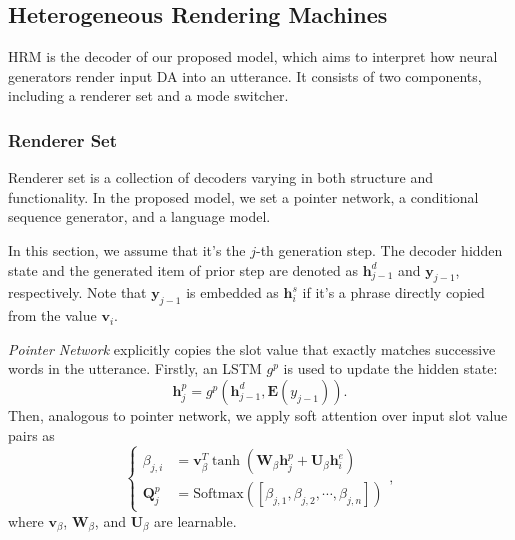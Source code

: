 \documentclass[letterpaper]{article} %
\begin{document}
\subsection{Heterogeneous Rendering Machines}
\label{sec:Heterogeneous Rendering Machines}

	HRM is the decoder of our proposed model, which aims to interpret how neural generators render input DA into an utterance. It consists of two components, including a renderer set and a mode switcher.

\subsubsection{Renderer Set}

	Renderer set is a collection of decoders varying in both structure and functionality. In the proposed model, we set a pointer network, a conditional sequence generator, and a language model.

	In this section, we assume that it's the $j$-th generation step. The decoder hidden state and the generated item of prior step are denoted as $\mathbf{h}_{j-1}^d$ and $\mathbf{y}_{j-1}$, respectively. Note that $\mathbf{y}_{j-1}$ is embedded as $\mathbf{h}_i^s$ if it's a phrase directly copied from the value $\mathbf{v}_i$.

	\textit{Pointer Network} explicitly copies the slot value that exactly matches successive words in the utterance. Firstly, an LSTM $g^{p}$ is used to update the hidden state:
	\begin{equation}
	\mathbf{h}_j^p = g^p(\mathbf{h}_{j-1}^d, \mathbf{E}(y_{j-1})).
	\end{equation}
	Then, analogous to pointer network, we apply soft attention over input slot value pairs as
	\begin{equation}
	\left\{\begin{aligned}
	\beta_{j,i} & = \mathbf{v}^T_{\beta} \tanh(\mathbf{W}_{\beta} \mathbf{h}^p_{j} + \mathbf{U}_{\beta}\mathbf{h}^e_i) \\
	\mathbf{Q}^p_j & = \mathrm{Softmax}([\beta_{j, 1}, \beta_{j, 2}, \cdots, \beta_{j, n}])
	\end{aligned}\right.,
	\end{equation}
	where $\mathbf{v}_{\beta}$, $\mathbf{W}_{\beta}$, and $\mathbf{U}_{\beta}$ are learnable.
\end{document}
